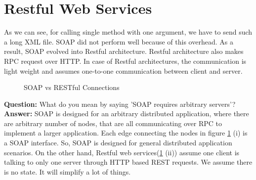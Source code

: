 \documentclass[twoside]{article}
\begin{document}
\section{Restful Web Services}
As we can see, for calling single method with one argument, we have to send such a long XML file. SOAP did not perform well because of this overhead. As a result, SOAP evolved into Restful architecture. Restful architecture also makes RPC request over HTTP. In case of Restful architectures, the communication is light weight and assumes one-to-one communication between client and server. \\
\begin{figure}[h]
\begin{center}
\caption{SOAP vs RESTful Connections}
\label{soap_rest}
\end{center}
\end{figure}
\textbf{Question:} What do you mean by saying 'SOAP requires arbitrary servers'?\\
\textbf{Answer:} SOAP is designed for an arbitrary distributed application, where there are arbitrary number of nodes, that are all communicating over RPC to implement a larger application. Each edge connecting the nodes in figure \ref{soap_rest} (i) is a SOAP interface. So, SOAP is designed for general distributed application scenarios. On the other hand, Restful web services(\ref{soap_rest} (ii)) assume one client is talking to only one server through HTTP based REST requests. We assume there is no state. It will simplify a lot of things. \\
\end{document}
